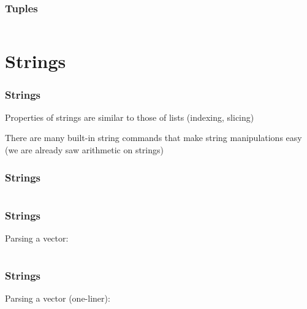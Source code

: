 \documentclass{beamer}
\begin{document}
\begin{frame}
\frametitle{Tuples}

\begin{center}
\begin{tabular}{c}

\end{tabular}
\end{center}

\end{frame}

\section{Strings}

\begin{frame}
\frametitle{Strings}
Properties of strings are similar to those of lists (indexing, slicing)

\vspace{0.1in}

There are many built-in string commands that make string manipulations easy (we are already saw arithmetic on strings)

\end{frame}


\begin{frame}
\frametitle{Strings}

\begin{center}
\begin{tabular}{c}

\end{tabular}
\end{center}

\end{frame}

\begin{frame}
\frametitle{Strings}
Parsing a vector:
\begin{center}
\begin{tabular}{c}

\end{tabular}
\end{center}

\end{frame}

\begin{frame}
\frametitle{Strings}
Parsing a vector (one-liner):
\begin{center}
\begin{tabular}{c}

\end{tabular}
\end{center}

\end{frame}
\end{document}

